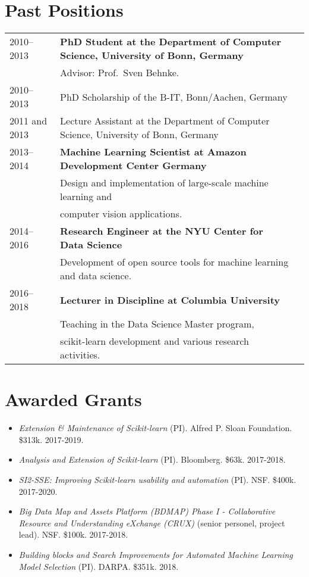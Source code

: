 \documentclass[a4paper,11pt]{article}
\begin{document}
\section{Past Positions}
\begin{tabular}{lll}

    2010--2013 & \textbf{PhD Student at the Department of Computer Science, University of Bonn, Germany}\\
         & Advisor: Prof.\ Sven Behnke. \\
    2010--2013 & PhD Scholarship of the B-IT, Bonn/Aachen, Germany\\
    2011 and 2013& Lecture Assistant at the Department of Computer Science, University of Bonn, Germany \\
    2013--2014 & \textbf{Machine Learning Scientist at Amazon Development Center Germany}\\
              & Design and implementation of large-scale machine learning and\\
              & computer vision applications.\\
    2014--2016 & \textbf{Research Engineer at the NYU Center for Data Science}\\
               & Development of open source tools for machine learning and data science.\\
    2016--2018 & \textbf{Lecturer in Discipline at Columbia University}\\
               & Teaching in the Data Science Master program, \\
               & scikit-learn development and various research activities.
\end{tabular}

\section{Awarded Grants}
\begin{itemize}
    \item \emph{Extension \& Maintenance of Scikit-learn} (PI). Alfred P. Sloan Foundation. \$313k. 2017-2019.
    \item \emph{Analysis and Extension of Scikit-learn} (PI). Bloomberg. \$63k. 2017-2018.
    \item \emph{SI2-SSE: Improving Scikit-learn usability and automation} (PI). NSF. \$400k. 2017-2020.
    \item \emph{Big Data Map and Assets Platform (BDMAP) Phase I - Collaborative Resource and Understanding eXchange (CRUX)} (senior personel, project lead). NSF. \$100k. 2017-2018.
    \item \emph{Building blocks and Search Improvements for Automated Machine Learning Model Selection} (PI). DARPA. \$351k. 2018.
\end{itemize}
\end{document}
